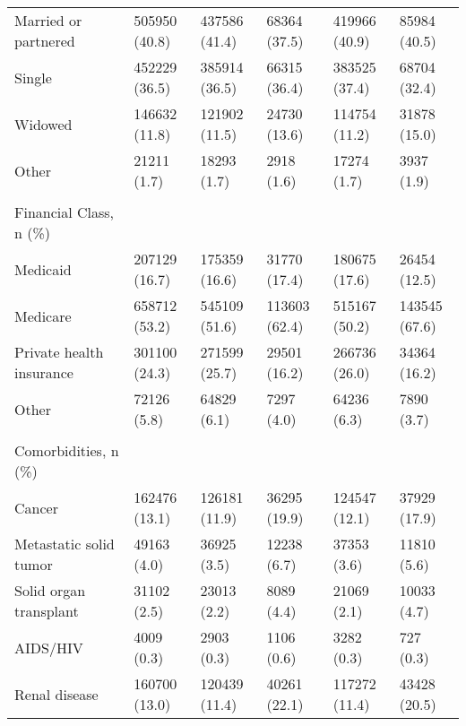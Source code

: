 \begin{adjustbox}{width={\textwidth},totalheight={\textheight},keepaspectratio,frame,padding=0ex 0ex -910ex 0ex}
{\begin{tabular}{L{20em}C{10em}C{10em}C{10em}C{10em}C{10em}}
  \hspace{3mm} Married or partnered & 505950 (40.8) & 437586 (41.4) & 68364 (37.5) & 419966 (40.9) & 85984 (40.5)\\
  \hspace{3mm} Single & 452229 (36.5) & 385914 (36.5) & 66315 (36.4) & 383525 (37.4) & 68704 (32.4)\\
  \hspace{3mm} Widowed & 146632 (11.8) & 121902 (11.5) & 24730 (13.6) & 114754 (11.2) & 31878 (15.0)\\
  \hspace{3mm} Other & 21211 (1.7) & 18293 (1.7) & 2918 (1.6) & 17274 (1.7) & 3937 (1.9)\\
  &  &  &  &  &  \\
Financial Class, n (\%)  & &    &     &        &         \\
 \hspace{3mm} Medicaid & 207129 (16.7) & 175359 (16.6) & 31770 (17.4) & 180675 (17.6) & 26454 (12.5)\\
  \hspace{3mm} Medicare & 658712 (53.2) & 545109 (51.6) & 113603 (62.4) & 515167 (50.2) & 143545 (67.6)\\
  \hspace{3mm} Private health insurance & 301100 (24.3) & 271599 (25.7) & 29501 (16.2) & 266736 (26.0) & 34364 (16.2)\\
  \hspace{3mm} Other & 72126 (5.8) & 64829 (6.1) & 7297 (4.0) & 64236 (6.3) & 7890 (3.7)\\
  &  &  &  &  &  \\
Comorbidities, n (\%)   & &    &     &        &         \\
\hspace{3mm} Cancer  & 162476 (13.1) & 126181 (11.9) & 36295 (19.9) & 124547 (12.1) & 37929 (17.9)\\
\hspace{3mm} Metastatic solid tumor  & 49163 (4.0) & 36925 (3.5) & 12238 (6.7) & 37353 (3.6) & 11810 (5.6)\\
\hspace{3mm} Solid organ transplant  & 31102 (2.5) & 23013 (2.2) & 8089 (4.4) & 21069 (2.1) & 10033 (4.7)\\
\hspace{3mm} AIDS/HIV  & 4009 (0.3) & 2903 (0.3) & 1106 (0.6) & 3282 (0.3) & 727 (0.3)\\
\hspace{3mm} Renal disease  & 160700 (13.0) & 120439 (11.4) & 40261 (22.1) & 117272 (11.4) & 43428 (20.5)\\

\end{tabular}}
\end{adjustbox}
